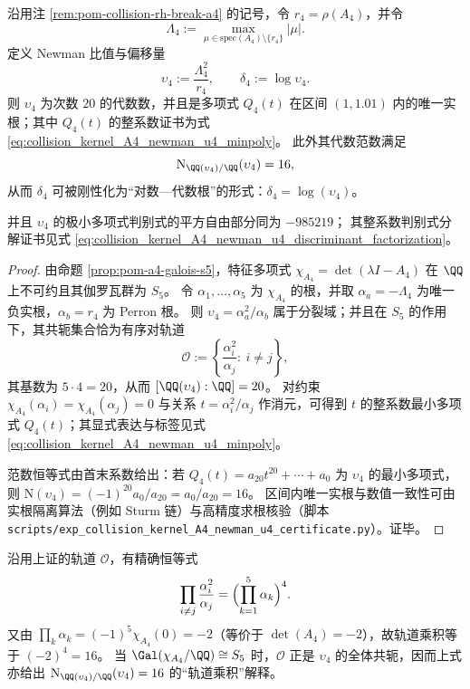 \begin{proposition}\label{prop:pom-a4-newman-u4-algebraic-certificate}
沿用注 \ref{rem:pom-collision-rh-break-a4} 的记号，令 \(r_4=\rho(A_4)\)，并令
\[
\Lambda_4:=\max_{\mu\in\mathrm{spec}(A_4)\setminus\{r_4\}}|\mu|.
\]
定义 Newman 比值与偏移量
\[
\upsilon_4:=\frac{\Lambda_4^2}{r_4},\qquad \delta_4:=\log \upsilon_4.
\]
则 \(\upsilon_4\) 为次数 \(20\) 的代数数，并且是多项式 \(Q_4(t)\) 在区间 \((1,1.01)\) 内的唯一实根；其中 \(Q_4(t)\) 的整系数证书为式 \eqref{eq:collision_kernel_A4_newman_u4_minpoly}。
此外其代数范数满足
\[
\mathrm{N}_{\QQ(\upsilon_4)/\QQ}(\upsilon_4)=16,
\]
从而 \(\delta_4\) 可被刚性化为“对数—代数根”的形式：\(\delta_4=\log(\upsilon_4)\)。
\par
并且 \(\upsilon_4\) 的极小多项式判别式的平方自由部分同为 \(-985219\)；
其整系数判别式分解证书见式 \eqref{eq:collision_kernel_A4_newman_u4_discriminant_factorization}。
\end{proposition}
\begin{proof}
由命题 \ref{prop:pom-a4-galois-s5}，特征多项式 \(\chi_{A_4}=\det(\lambda I-A_4)\) 在 \(\QQ\) 上不可约且其伽罗瓦群为 \(S_5\)。
令 \(\alpha_1,\dots,\alpha_5\) 为 \(\chi_{A_4}\) 的根，并取 \(\alpha_a=-\Lambda_4\) 为唯一负实根，\(\alpha_b=r_4\) 为 Perron 根。
则 \(\upsilon_4=\alpha_a^2/\alpha_b\) 属于分裂域；并且在 \(S_5\) 的作用下，其共轭集合恰为有序对轨道
\[
\mathcal{O}:=\left\{\frac{\alpha_i^2}{\alpha_j}:\ i\neq j\right\},
\]
其基数为 \(5\cdot 4=20\)，从而 \([\QQ(\upsilon_4):\QQ]=20\)。
对约束 \(\chi_{A_4}(\alpha_i)=\chi_{A_4}(\alpha_j)=0\) 与关系 \(t=\alpha_i^2/\alpha_j\) 作消元，可得到 \(t\) 的整系数最小多项式 \(Q_4(t)\)；其显式表达与标签见式 \eqref{eq:collision_kernel_A4_newman_u4_minpoly}。
\par
范数恒等式由首末系数给出：若 \(Q_4(t)=a_{20}t^{20}+\cdots+a_0\) 为 \(\upsilon_4\) 的最小多项式，则
\(
\mathrm{N}(\upsilon_4)=(-1)^{20}a_0/a_{20}=a_0/a_{20}=16
\)。
区间内唯一实根与数值一致性可由实根隔离算法（例如 Sturm 链）与高精度求根核验（脚本 \texttt{scripts/exp\_collision\_kernel\_A4\_newman\_u4\_certificate.py}）。证毕。
\end{proof}




\begin{remark}\label{rem:pom-a4-u4-orbit-product-norm}
沿用上证的轨道 \(\mathcal{O}\)，有精确恒等式
\[
\prod_{i\neq j}\frac{\alpha_i^2}{\alpha_j}
=\Bigl(\prod_{k=1}^5\alpha_k\Bigr)^{4}.
\]
又由 \(\prod_k\alpha_k=(-1)^5\chi_{A_4}(0)=-2\)（等价于 \(\det(A_4)=-2\)），故轨道乘积等于 \((-2)^4=16\)。
当 \(\Gal(\chi_{A_4}/\QQ)\cong S_5\) 时，\(\mathcal{O}\) 正是 \(\upsilon_4\) 的全体共轭，因而上式亦给出 \(\mathrm{N}_{\QQ(\upsilon_4)/\QQ}(\upsilon_4)=16\) 的“轨道乘积”解释。
\end{remark}
